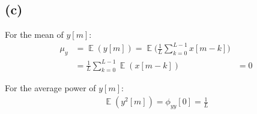 \documentclass{article}
\DeclareMathOperator{\E}{\mathbb{E}}
\begin{document}
\subsection{(c)}
For the mean of $y[m]$:
\begin{align} \nonumber
\mu_y &= \E(y[m]) = \E\bigg(\frac{1}{L}\sum_{k=0}^{L-1}x[m-k]\bigg) \\ \nonumber
&=\frac{1}{L}\sum_{k=0}^{L-1}\E(x[m-k])
&=0
\end{align}

For the average power of $y[m]$:
\begin{align} \nonumber
\E(y^2[m]) = \phi_{yy}[0] = \frac{1}{L}
\end{align}
\end{document}
